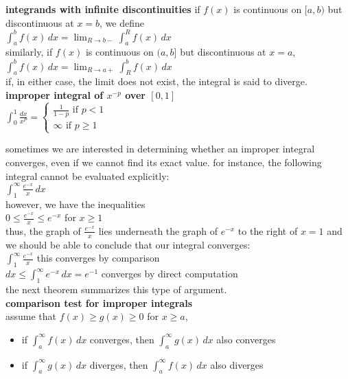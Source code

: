 \documentclass{article}
\begin{document}
\textbf{integrands with infinite discontinuities} if $f(x)$ is continuous on $[a, b)$ but discontinuous at $x = b$, we define\\
$\int_{a}^{b}f(x)\,dx = \lim_{R \to b-}\int_{a}^{R}f(x)\,dx$\\
similarly, if $f(x)$ is continuous on $(a, b]$ but discontinuous at $x = a$,\\
$\int_{a}^{b}f(x)\,dx = \lim_{R \to a+}\int_{R}^{b}f(x)\,dx$\\
if, in either case, the limit does not exist, the integral is said to diverge.\\

\textbf{improper integral of $x^{-p}$ over $[0, 1]$}\\
$\int_{0}^{1}\frac{dx}{x^P} = 
\begin{cases}
	\frac{1}{1 - p} \text{ if } p<1\\
	\infty \text{ if } p\geq1
\end{cases}$

sometimes we are interested in determining whether an improper integral converges, even if we cannot find its exact value. for instance, the following integral cannot be evaluated explicitly:\\
$\int_{1}^{\infty}\frac{e^{-x}}{x}\,dx$\\
however, we have the inequalities\\
$0 \leq \frac{e^{-x}}{x} \leq e^{-x}$ for $x \geq 1$\\
thus, the graph of $\frac{e^{-x}}{x}$ lies underneath the graph of $e^{-x}$ to the right of $x = 1$ and we should be able to conclude that our integral converges:\\
$\int_{1}^{\infty}\frac{e^{-x}}{x}$ this converges by comparison\\
$dx \leq \int_{1}^{\infty}e^{-x}\,dx = e^{-1}$ converges by direct computation\\
the next theorem summarizes this type of argument.\\

\textbf{comparison test for improper integrals}\\
assume that $f(x) \geq g(x) \geq 0$ for $x \geq a$,
	\begin{itemize}
		\item if $\int_{a}^{\infty}f(x)\,dx$ converges, then $\int_{a}^{\infty}g(x)\,dx$ also converges
		\item if $\int_{a}^{\infty}g(x)\,dx$ diverges, then $\int_{a}^{\infty}f(x)\,dx$ also diverges
	\end{itemize}
\end{document}
